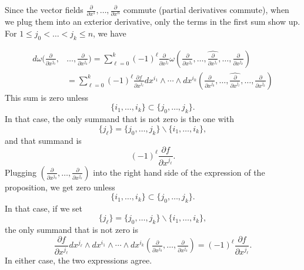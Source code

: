 \documentclass{ximera}
\begin{document}
    \begin{solution}
        Since the vector fields $ \tfrac{\partial }{\partial x ^1}, \ldots , \tfrac{\partial }{\partial x ^n} $ commute (partial derivatives commute), when we plug them into an exterior derivative, only the terms in the first sum show up.  For $1 \leq j_0 < \ldots < j_k \leq n$, we have

    \begin{align*}
        d \omega  (\tfrac{\partial }{\partial x ^{j_0}},  & \ldots ,  \tfrac{\partial }{\partial x ^{j_k}} )       =  \sum_{\ell = 0} ^k (-1 ) ^{\ell} \frac{\partial }{\partial x ^{j_{\ell}}}  \omega (\tfrac{\partial }{\partial x ^{j_0}}, \ldots ,\hat{\tfrac{\partial}{\partial x ^{j_{\ell}}}} , \ldots , \tfrac{\partial }{\partial x ^{j_k}} )   \\
        & = \sum _{\ell  = 0} ^k (-1 ) ^{\ell} \frac{\partial f }{\partial x ^{j_{\ell}}} dx ^{i_1} \wedge \cdots \wedge dx ^{i_k} ( \tfrac{\partial}{\partial x ^{j_0}} , \ldots , \hat{\tfrac{\partial}{\partial x ^{j_{\ell}}}} , \ldots ,  \tfrac{\partial}{\partial x ^{j_k}} ) 
     \end{align*}
    This sum is zero unless 
     \[    \{ i_1, \ldots , i_k \} \subset \{ j_0, \ldots , j_k \}   .                        \] 
    In that case, the only summand that is not zero is the one with 
    \[     \{ j _{\ell} \}  = \{ j_0, \ldots    , j_k \}  \backslash  \{ i_1, \ldots , i_k \}   ,  \] 
     and that summand is 
     \[    (-1) ^{\ell} \frac{\partial f}{\partial x ^{j_{\ell}}} .                      \]
     Plugging $(\tfrac{\partial }{\partial x ^{j_0}}, \ldots ,  \tfrac{\partial }{\partial x ^{j_k}} )$ into the right hand side of the expression of the proposition, we get zero unless 
     \[    \{ i_1, \ldots , i_k \} \subset \{ j_0, \ldots , j_k \} .          \]
     In that case, if we set
     \[ \{j_{\ell} \} =   \{ j_0, \ldots , j_k \} \backslash  \{ i_1, \ldots , i_k \} , \] 
     the only summand that is not zero is 
     \[      \frac{\partial f}{\partial x ^{j_{\ell}}}  d x ^{j_{\ell}} \wedge d x ^{i_1 } \wedge \cdots \wedge dx ^{i_k} ( \tfrac{\partial }{\partial x ^{j_0}}, \ldots ,  \tfrac{\partial }{\partial x ^{j_k}}  ) = (-1 )^{\ell} \frac{\partial f}{\partial x ^{j_{\ell}}} .      \]
     In either case, the two expressions agree.
    \end{solution}
\end{document}
